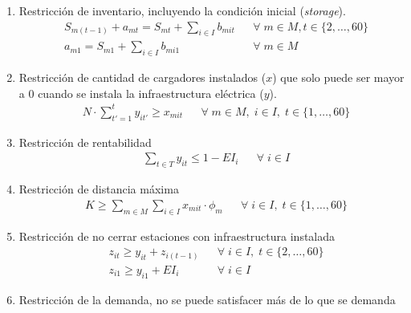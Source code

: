 \documentclass[letterpaper]{article}
\begin{document}
\begin{flushleft}
	\begin{enumerate}
		\item Restricción de inventario, incluyendo la condici\'on inicial (\textit{storage}).
		\begin{align*}
			&S_{m(t-1)} + a_{mt} = S_{mt} + \sum_{i \in I} b_{mit} &&\forall \; m \in M, t \in \{2, \ldots, 60\}\\
			&a_{m1} = S_{m1} + \sum_{i \in I} b_{mi1}  && \forall \; m \in M
		\end{align*}
		\item Restricción de cantidad de cargadores instalados ($x$) que solo puede ser mayor a $0$ cuando se instala la infraestructura eléctrica ($y$).
		\begin{align*}
			&N \cdot \sum_{t'=1}^{t} y_{it'} \geq x_{mit} && \forall \; m \in M, \; i \in I,\; t \in \{1, \ldots, 60\}
		\end{align*}
		\item Restricción de rentabilidad
		\begin{align*}
			&\sum_{t \in T} y_{it} \leq 1 - EI_i && \forall \; i \in I
		\end{align*}
		\item Restricción de distancia máxima
		\begin{align*}
			&K \geq \sum_{m \in M} \sum_{i \in I} x_{mit} \cdot \phi_m && \forall \; i \in I, \; t \in \{1, \ldots, 60\}
		\end{align*}
		\item Restricción de no cerrar estaciones con infraestructura instalada
		\begin{align*}
			&z_{it} \geq y_{it} + z_{i(t-1)} && \forall \; i \in I, \;t \in \{2, \ldots, 60\}\\
			&z_{i1} \geq y_{i1} + EI_i && \forall \; i \in I
		\end{align*}
		\item Restricción de la demanda, no se puede satisfacer más de lo que se demanda
		\begin{align*}
		\end{align*}
	\end{enumerate}


\end{flushleft}
\end{document}
